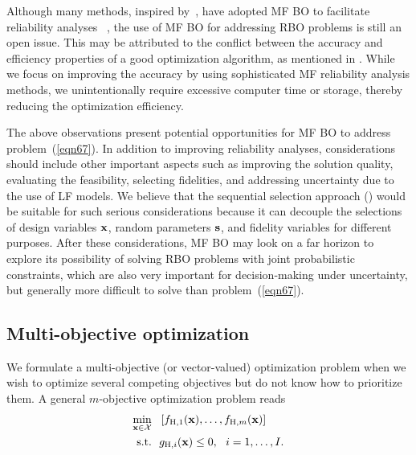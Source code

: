 \documentclass[journal ]{new-aiaa}
\begin{document}
Although many methods, inspired by~\citet{Bichon2008}, have adopted MF BO to facilitate reliability analyses ~\citep[see e.g.,][]{Chaudhuri2021,Patsialis2021,ZhangC2022,AshwinRenganathan2023}, the use of MF BO for addressing RBO problems is still an open issue.
This may be attributed to the conflict between the accuracy and efficiency properties of a good optimization algorithm, as mentioned in .
While we focus on improving the accuracy by using sophisticated MF reliability analysis methods, we unintentionally require excessive computer time or storage, thereby reducing the optimization efficiency.    

The above observations present potential opportunities for MF BO to address problem~(\ref{eqn67}).
In addition to improving reliability analyses, considerations should include other important aspects such as improving the solution quality, evaluating the feasibility, selecting fidelities, and addressing uncertainty due to the use of LF models.
We believe that the sequential selection approach () would be suitable for such serious considerations because it can decouple the selections of design variables $\bf x$, random parameters $\bf s$, and fidelity variables for different purposes.   
After these considerations, MF BO may look on a far horizon to explore its possibility of solving RBO problems with joint probabilistic constraints, which are also very important for decision-making under uncertainty, but generally more difficult to solve than problem~(\ref{eqn67}).

\subsection{Multi-objective optimization}\label{Sec64}

We formulate a multi-objective (or vector-valued) optimization problem when we wish to optimize several competing objectives but do not know how to prioritize them.
A general $m$-objective optimization problem reads
\begin{equation}\label{eqn68}
	\begin{aligned}
		\underset{{\bf x} \in \mathcal{X}}{\min} \ \ & \left[f_{\text{H},1}({\bf x}),\dots,f_{\text{H},m}({\bf x})\right]\\
		\textrm{s.t.} \ \ 
		& g_{\text{H},i}({\bf x}) \leq 0,\ \ i=1,\dots,I. 
	\end{aligned}
\end{equation}
\end{document}
